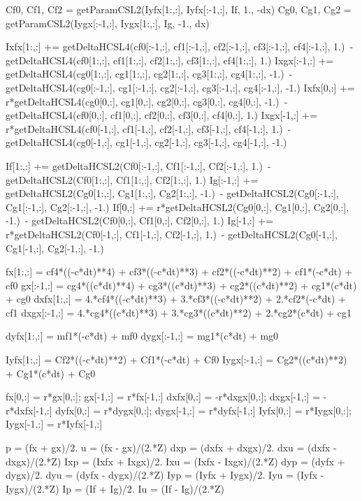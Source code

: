 \documentclass[dvipdfmx, 9pt, a4paper]{jsarticle}
\begin{document}
\begin{python}
	Cf0, Cf1, Cf2 = getParamCSL2(Iyfx[1:,:], Iyfx[:-1,:], If, 1., -dx)
	Cg0, Cg1, Cg2 = getParamCSL2(Iygx[:-1,:], Iygx[1:,:], Ig, -1., dx)

	Ixfx[1:,:] += getDeltaHCSL4(cf0[:-1,:], cf1[:-1,:], cf2[:-1,:], cf3[:-1,:], cf4[:-1,:], 1.)\
	 - getDeltaHCSL4(cf0[1:,:], cf1[1:,:], cf2[1:,:], cf3[1:,:], cf4[1:,:], 1.)
	Ixgx[:-1,:] += getDeltaHCSL4(cg0[1:,:], cg1[1:,:], cg2[1:,:], cg3[1:,:], cg4[1:,:], -1.)\
	 - getDeltaHCSL4(cg0[:-1,:], cg1[:-1,:], cg2[:-1,:], cg3[:-1,:], cg4[:-1,:], -1.)
	Ixfx[0,:] += r*getDeltaHCSL4(cg0[0,:], cg1[0,:], cg2[0,:], cg3[0,:], cg4[0,:], -1.)\
	 - getDeltaHCSL4(cf0[0,:], cf1[0,:], cf2[0,:], cf3[0,:], cf4[0,:], 1.)
	Ixgx[-1,:] += r*getDeltaHCSL4(cf0[-1,:], cf1[-1,:], cf2[-1,:], cf3[-1,:], cf4[-1,:], 1.)\
	 - getDeltaHCSL4(cg0[-1,:], cg1[-1,:], cg2[-1,:], cg3[-1,:], cg4[-1,:], -1.)

	If[1:,:] += getDeltaHCSL2(Cf0[:-1,:], Cf1[:-1,:], Cf2[:-1,:], 1.)\
	 - getDeltaHCSL2(Cf0[1:,:], Cf1[1:,:], Cf2[1:,:], 1.)
	Ig[:-1,:] += getDeltaHCSL2(Cg0[1:,:], Cg1[1:,:], Cg2[1:,:], -1.)\
	 - getDeltaHCSL2(Cg0[:-1,:], Cg1[:-1,:], Cg2[:-1,:], -1.)
	If[0,:] += r*getDeltaHCSL2(Cg0[0,:], Cg1[0,:], Cg2[0,:], -1.)\
	 - getDeltaHCSL2(Cf0[0,:], Cf1[0,:], Cf2[0,:], 1.)
	Ig[-1,:] += r*getDeltaHCSL2(Cf0[-1,:], Cf1[-1,:], Cf2[-1,:], 1.)\
	 - getDeltaHCSL2(Cg0[-1,:], Cg1[-1,:], Cg2[-1,:], -1.)

	fx[1:,:] = cf4*((-c*dt)**4) + cf3*((-c*dt)**3) + cf2*((-c*dt)**2) + cf1*(-c*dt) + cf0
	gx[:-1,:] = cg4*((c*dt)**4) + cg3*((c*dt)**3) + cg2*((c*dt)**2) + cg1*(c*dt) + cg0
	dxfx[1:,:] = 4.*cf4*((-c*dt)**3) + 3.*cf3*((-c*dt)**2) + 2.*cf2*(-c*dt) + cf1
	dxgx[:-1,:] = 4.*cg4*((c*dt)**3) + 3.*cg3*((c*dt)**2) + 2.*cg2*(c*dt) + cg1

	dyfx[1:,:] = mf1*(-c*dt) + mf0
	dygx[:-1,:] = mg1*(c*dt) + mg0

	Iyfx[1:,:] = Cf2*((-c*dt)**2) + Cf1*(-c*dt) + Cf0
	Iygx[:-1,:] = Cg2*((c*dt)**2) + Cg1*(c*dt) + Cg0

	fx[0,:] = r*gx[0,:]; gx[-1,:] = r*fx[-1,:]
	dxfx[0,:] = -r*dxgx[0,:]; dxgx[-1,:] = -r*dxfx[-1,:]
	dyfx[0,:] = r*dygx[0,:]; dygx[-1,:] = r*dyfx[-1,:]
	Iyfx[0,:] = r*Iygx[0,:]; Iygx[-1,:] = r*Iyfx[-1,:]

	p = (fx + gx)/2.
	u = (fx - gx)/(2.*Z)
	dxp = (dxfx + dxgx)/2.
	dxu = (dxfx - dxgx)/(2.*Z)
	Ixp = (Ixfx + Ixgx)/2.
	Ixu = (Ixfx - Ixgx)/(2.*Z)
	dyp = (dyfx + dygx)/2.
	dyu = (dyfx - dygx)/(2.*Z)
	Iyp = (Iyfx + Iygx)/2.
	Iyu = (Iyfx - Iygx)/(2.*Z)
	Ip = (If + Ig)/2.
	Iu = (If - Ig)/(2.*Z)


\end{python}
\end{document}
